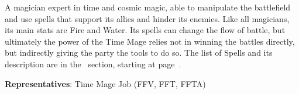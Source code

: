 \begin{jobdesc}[name=pjob-timemage]
    A magician expert in time and cosmic magic, able to manipulate the battlefield and use spells that support its allies and hinder its enemies. Like all magicians, its main stats are Fire and Water. Its spells can change the flow of battle, but ultimately the power of the Time Mage relies not in winning the battles directly, but indirectly giving the party the tools to do so. The list of Spells and its description are in the~ section, starting at page~\pageref{sec:magic-time}. \pc%

    \textbf{Representatives}: Time Mage Job (FFV, FFT, FFTA) \pc%

    \jobstats[hpa=3x,hpb=4x,hpc=5x,hpd=6x,mpa=2x,mpb=3x,mpc=4x,armor=Light,weapons=Claws / Gloves \\ Light Swords / Knives \\ Staves \\ Wands]
\end{jobdesc}


